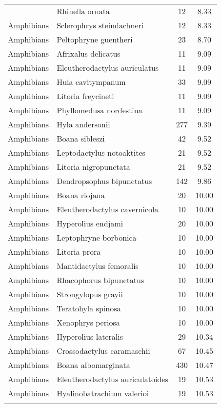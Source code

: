 \begin{longtable}{llcc}
{  Amphibians & Rhinella ornata &  12 & 8.33 \\ 
  Amphibians & Sclerophrys steindachneri &  12 & 8.33 \\ 
  Amphibians & Peltophryne guentheri &  23 & 8.70 \\ 
  Amphibians & Afrixalus delicatus &  11 & 9.09 \\ 
  Amphibians & Eleutherodactylus auriculatus &  11 & 9.09 \\ 
  Amphibians & Huia cavitympanum &  33 & 9.09 \\ 
  Amphibians & Litoria freycineti &  11 & 9.09 \\ 
  Amphibians & Phyllomedusa nordestina &  11 & 9.09 \\ 
  Amphibians & Hyla andersonii & 277 & 9.39 \\ 
  Amphibians & Boana sibleszi &  42 & 9.52 \\ 
  Amphibians & Leptodactylus notoaktites &  21 & 9.52 \\ 
  Amphibians & Litoria nigropunctata &  21 & 9.52 \\ 
  Amphibians & Dendropsophus bipunctatus & 142 & 9.86 \\ 
  Amphibians & Boana riojana &  20 & 10.00 \\ 
  Amphibians & Eleutherodactylus cavernicola &  10 & 10.00 \\ 
  Amphibians & Hyperolius endjami &  20 & 10.00 \\ 
  Amphibians & Leptophryne borbonica &  10 & 10.00 \\ 
  Amphibians & Litoria prora &  10 & 10.00 \\ 
  Amphibians & Mantidactylus femoralis &  10 & 10.00 \\ 
  Amphibians & Rhacophorus bipunctatus &  10 & 10.00 \\ 
  Amphibians & Strongylopus grayii &  10 & 10.00 \\ 
  Amphibians & Teratohyla spinosa &  10 & 10.00 \\ 
  Amphibians & Xenophrys periosa &  10 & 10.00 \\ 
  Amphibians & Hyperolius lateralis &  29 & 10.34 \\ 
  Amphibians & Crossodactylus caramaschii &  67 & 10.45 \\ 
  Amphibians & Boana albomarginata & 430 & 10.47 \\ 
  Amphibians & Eleutherodactylus auriculatoides &  19 & 10.53 \\ 
  Amphibians & Hyalinobatrachium valerioi &  19 & 10.53 \\ 
}
\end{longtable}
